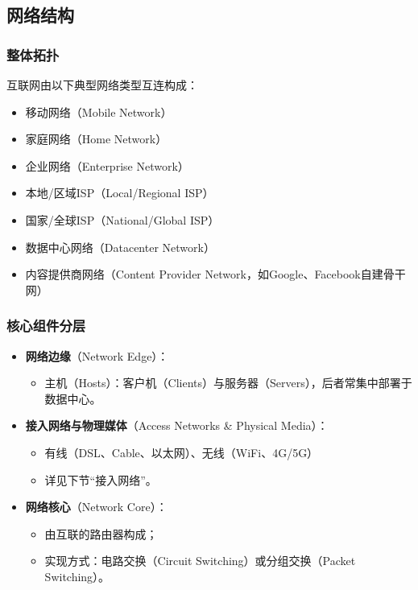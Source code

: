 \subsection{网络结构}

\subsubsection{整体拓扑}

互联网由以下典型网络类型互连构成：
\begin{itemize}
    \item 移动网络（Mobile Network）
    \item 家庭网络（Home Network）
    \item 企业网络（Enterprise Network）
    \item 本地/区域ISP（Local/Regional ISP）
    \item 国家/全球ISP（National/Global ISP）
    \item 数据中心网络（Datacenter Network）
    \item 内容提供商网络（Content Provider Network，如Google、Facebook自建骨干网）
\end{itemize}

\subsubsection{核心组件分层}

\begin{itemize}
    \item \textbf{网络边缘}（Network Edge）：
          \begin{itemize}
              \item 主机（Hosts）：客户机（Clients）与服务器（Servers），后者常集中部署于数据中心。
          \end{itemize}

    \item \textbf{接入网络与物理媒体}（Access Networks \& Physical Media）：
          \begin{itemize}
              \item 有线（DSL、Cable、以太网）、无线（WiFi、4G/5G）
              \item 详见下节“接入网络”。
          \end{itemize}

    \item \textbf{网络核心}（Network Core）：
          \begin{itemize}
              \item 由互联的路由器构成；
              \item 实现方式：电路交换（Circuit Switching）或分组交换（Packet Switching）。
          \end{itemize}
\end{itemize}

